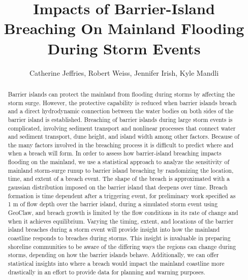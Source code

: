 \documentclass{coastal_paper}
\title{Impacts of Barrier-Island Breaching On Mainland Flooding During Storm Events}
\author{Catherine Jeffries, Robert Weiss, Jennifer Irish, Kyle Mandli}
\begin{document}
\sffamily
\maketitle
\begin{abstract}
Barrier islands can protect the mainland from flooding during storms by affecting the storm surge. However, the protective capability is reduced when barrier islands breach and a direct hydrodynamic connection between the water bodies on both sides of the barrier island is established. Breaching of barrier islands during large storm events is complicated, involving sediment transport and nonlinear processes that connect water and sediment transport, dune height, and island width among other factors. Because of the many factors involved in the breaching process it is difficult to predict where and when a breach will form. In order to assess how barrier-island breaching impacts flooding on the mainland, we use a statistical approach to analyze the sensitivity of mainland storm-surge runup to barrier island breaching by randomizing the location, time, and extent of a breach event. The shape of the breach is approximated with a gaussian distribution imposed on the barrier island that deepens over time. Breach formation is time dependent after a triggering event, for preliminary work specified as 1 m of flow depth over the barrier island, during a simulated storm event using GeoClaw, and breach growth is limited by the flow conditions in its rate of change and when it achieves equilibrium. Varying the timing, extent, and locations of the barrier island breaches during a storm event will provide insight into how the mainland coastline responds to breaches during storms. This insight is invaluable in preparing shoreline communities to be aware of the differing ways the regions can change during storms, depending on how the barrier islands behave. Additionally, we can offer statistical insights into where a breach would impact the mainland coastline more drastically in an effort to provide data for planning and warning purposes.    
\end{abstract}
\newpage

\linenumbers
\end{document}
